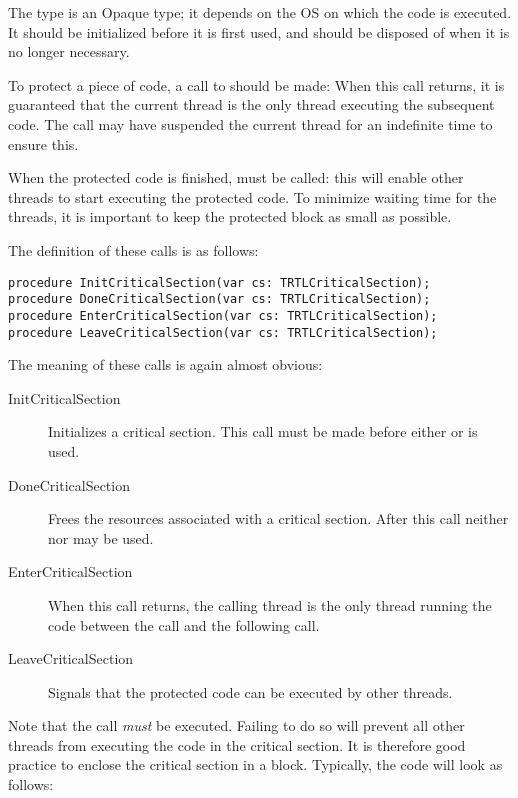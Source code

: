 The  type is an Opaque type; it depends on the 
OS on which the code is executed. It should be initialized before it 
is first used, and should be disposed of when it is no longer necessary.

To protect a piece of code, a call to  should 
be made: When this call returns, it is guaranteed that the current thread 
is the only thread executing the subsequent code. The call may have 
suspended the current thread for an indefinite time to ensure this. 

When the protected code is finished,  must 
be called: this will enable other threads to start executing the protected
code. To minimize waiting time for the threads, it is important to keep 
the protected block as small as possible.

The definition of these calls is as follows:
\begin{verbatim}
procedure InitCriticalSection(var cs: TRTLCriticalSection);
procedure DoneCriticalSection(var cs: TRTLCriticalSection);
procedure EnterCriticalSection(var cs: TRTLCriticalSection);
procedure LeaveCriticalSection(var cs: TRTLCriticalSection);
\end{verbatim}
The meaning of these calls is again almost obvious:
\begin{description}
\item[InitCriticalSection] Initializes a critical section. 
This call must be made before either  
or  is used.
\item[DoneCriticalSection] Frees the resources associated with a
critical section. After this call neither  
nor  may be used.
\item[EnterCriticalSection] When this call returns, the calling 
thread is the only thread running the code between the  
call and the following  call.
\item[LeaveCriticalSection] Signals that the protected code can be executed 
by other threads.
\end{description}
Note that the  call {\em must} be executed. 
Failing to do so will prevent all other threads from executing the code 
in the critical section. It is therefore good practice to enclose the 
critical section in a  block. Typically, the code
will look as follows:

